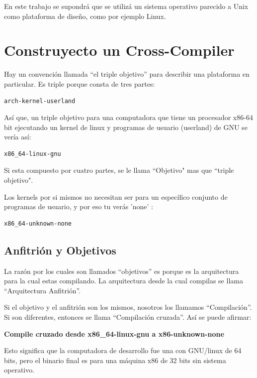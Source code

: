 \documentclass[12pt, twoside]{report}
\begin{document}
En este trabajo se supondrá que se utilizá un sistema operativo parecido a Unix como plataforma de diseño, como por ejemplo Linux.

\section{Construyecto un \textbf{Cross-Compiler}}
Hay un convención llamada ``el triple objetivo'' para describir una plataforma en particular. Es triple porque consta de tres partes:

\begin{lstlisting}[language=bash]
arch-kernel-userland
\end{lstlisting}
Así que, un triple objetivo para una computadora que tiene un procesador x86-64 bit ejecutando un kernel de linux y programas de usuario (userland) de GNU se vería así:

\begin{lstlisting}[language=bash]
x86_64-linux-gnu
\end{lstlisting}
Si esta compuesto por cuatro partes, se le llama ``Objetivo" mas que ``triple objetivo".

Los kernels por si mismos no necesitan ser para un específico conjunto de programas de usuario, y por eso tu verás 'none' :

\begin{lstlisting}[language=bash]
x86_64-unknown-none
\end{lstlisting}

\subsection{Anfitrión y Objetivos}

La razón por los cuales son llamados ``objetivos'' es porque es la arquitectura para la cual estas compilando. La arquitectura desde la cual compilas se llama ``Arquitectura Anfitrión''.

Si el objetivo y el anfitrión son los mismos, nosotros los llamamos ``Compilación''. Si son diferentes, entonces se llama ``Compilación cruzada''. Así se puede afirmar:


 \begin{flushright}
 \textbf{Compile cruzado desde x86\_64-linux-gnu a x86-unknown-none}
 \end{flushright}

Esto significa que la computadora de desarrollo fue una con GNU/linux de 64 bits, pero el binario final es para una máquina x86 de 32 bits sin sistema operativo.
\end{document}
